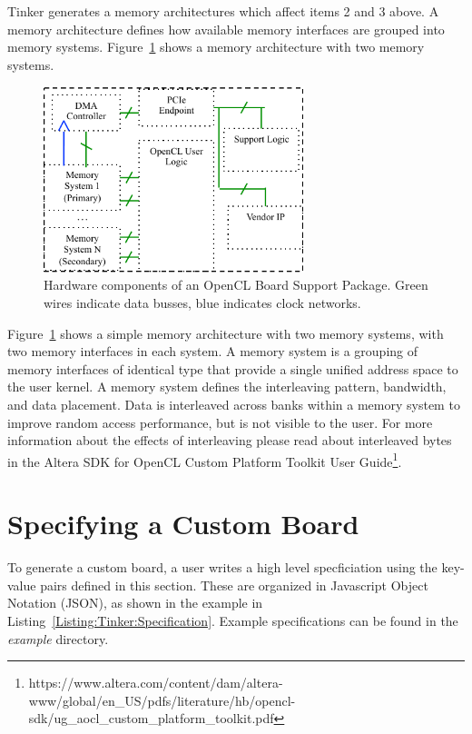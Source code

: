 \documentclass{refrep}
\newcommand{\Directory}[1]{\textit{#1}}
\begin{document}
Tinker generates a memory architectures which affect items 2 and 3 above. 
A memory architecture defines how available memory interfaces
are grouped into memory systems. Figure~\ref{Fig:Tinker:OpenCLBSP} shows a
memory architecture with two memory systems.

\begin{figure}[h]
\centering
\includegraphics[width=3in]{OpenCLBSP.pdf}
\caption{Hardware components of an OpenCL Board Support Package. Green wires
  indicate data busses, blue indicates clock networks.}
\label{Fig:Tinker:OpenCLBSP}
\end{figure}

Figure~\ref{Fig:Tinker:OpenCLBSP} shows a simple memory architecture with two
memory systems, with two memory interfaces in each system. A memory system is a
grouping of memory interfaces of identical type that provide a single unified
address space to the user kernel. A memory system defines the interleaving
pattern, bandwidth, and data placement.  Data is interleaved across banks within
a memory system to improve random access performance, but is not visible to the
user. For more information about the effects of interleaving please read about
interleaved bytes in the Altera SDK for OpenCL Custom Platform Toolkit User
Guide\footnote{https://www.altera.com/content/dam/altera-www/global/en\_US/pdfs/literature/hb/opencl-sdk/ug\_aocl\_custom\_platform\_toolkit.pdf}.



\section{Specifying a Custom Board}
\label{Chapter:Generating:Sec:Generation}
To generate a custom board, a user writes a high level specficiation using the
key-value pairs defined in this section. These are organized in Javascript
Object Notation (JSON), as shown in the example in
Listing~\ref{Listing:Tinker:Specification}. Example specifications can be found
in the \Directory{example} directory.
\end{document}
